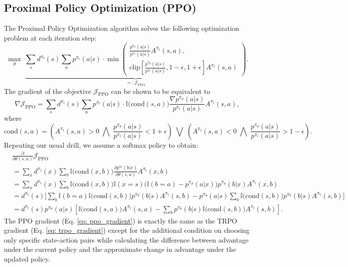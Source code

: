 \documentclass[a4paper, 10pt]{article}
\begin{document}
\subsection{Proximal Policy Optimization (PPO)}
The Proximal Policy Optimization algorithm \citep{schulman2017proximal} solves the following optimization problem at each iteration step:
\begin{equation}
  \max_\theta \; \underbrace{\sum_s d^{\pi_t}(s) \sum_a p^{\pi_t}(a | s) \cdot \min \left( \begin{matrix} \frac{p^{\pi_\theta}(a | s)}{p^{\pi_t}(a | s)} A^{\pi_t}(s, a), \\ \text{clip} \left[\frac{p^{\pi_\theta}(a | s)}{p^{\pi_t}(a | s)}, 1 - \epsilon, 1 + \epsilon \right] A^{\pi_t}(s, a) \end{matrix} \right)}_{=: \mathcal{J}_{\text{PPO}}}.
\end{equation}
The gradient of the objective $\mathcal{J}_{\text{PPO}}$ can be shown to be equivalent to
\begin{equation}
  \nabla \mathcal{J}_{\text{PPO}} = \sum_s d^{\pi_t}(s) \sum_a p^{\pi_t}(a | s) \cdot \mathbb{I} \Big( \text{cond}(s, a) \Big) \frac{\nabla p^{\pi_\theta}(a | s)}{p^{\pi_t}(a | s)} A^{\pi_t}(s, a),
\end{equation}
where 
\begin{equation}
  \text{cond}(s, a) = \left( A^{\pi_t}(s, a) > 0 \;\bigwedge\; \frac{p^{\pi_\theta}(a | s)}{p^{\pi_t}(a | s)} < 1 + \epsilon \right) \;\bigvee\; \left( A^{\pi_t}(s, a) < 0 \;\bigwedge\; \frac{p^{\pi_\theta}(a | s)}{p^{\pi_t}(a | s)} > 1 - \epsilon \right).
\end{equation}
Repeating our usual drill, we assume a softmax policy to obtain:
\begin{align}
  & \frac{\partial}{\partial \theta(s, a)} \mathcal{J}_{\text{PPO}} \nonumber \\
  &= \sum_x d^{\pi_t}(x) \sum_b \mathbb{I} \Big( \text{cond}(x, b) \Big) \frac{\partial p^{\pi_\theta}(b | x)}{\partial \theta(s, a)} A^{\pi_t}(x, b) \nonumber \\
  &= \sum_x d^{\pi_t}(x) \sum_b \mathbb{I} \Big( \text{cond}(x, b) \Big) \mathbb{I}(x = s) \Big( \mathbb{I}(b = a) - p^{\pi_\theta}(a | x) \Big) p^{\pi_\theta}(b | x) A^{\pi_t}(x, b) \nonumber \\
  &= d^{\pi_t}(s) \Bigg[ \sum_b \mathbb{I}(b = a) \mathbb{I} \Big( \text{cond}(s, b) \Big) p^{\pi_\theta}(b | s) A^{\pi_t}(s, b) - p^{\pi_\theta}(a | s) \sum_b \mathbb{I} \Big( \text{cond}(s, b) \Big) p^{\pi_\theta}(b | s) A^{\pi_t}(s, b) \Bigg] \nonumber \\
    &= d^{\pi_t}(s) p^{\pi_\theta}(a | s) \left[ \mathbb{I} \Big( \text{cond}(s, a) \Big) A^{\pi_t}(s, a) - \sum_b p^{\pi_\theta}(b | s) \mathbb{I} \Big( \text{cond}(s, b) \Big) A^{\pi_t}(s, b) \right]. \label{eq: ppo_gradient}
\end{align}
The PPO gradient (Eq. \ref{eq: ppo_gradient}) is exactly the same as the TRPO gradient (Eq. \ref{eq: trpo_gradient}) except for the additional condition on choosing only specific state-action pairs while calculating the difference between advantage under the current policy and the approximate change in advantage under the updated policy.
\end{document}
